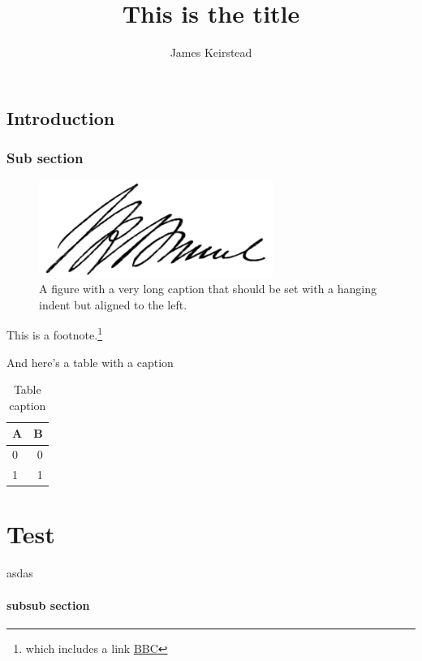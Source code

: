 \documentclass[a4paper]{imparticle}
\title{This is the title}
\author{James Keirstead}
\begin{document}
\maketitle

\section{Introduction}

\lipsum[1]

\subsection{Sub section}
\lipsum[2]

\begin{figure}[htbp]
  \includegraphics[width=3in]{Isambard_Kingdom_Brunel_signature.png}
  \caption{A figure with a very long caption that should be set with a hanging indent but aligned to the left.}
\end{figure}

This is a footnote.\footnote{which includes a link \href{http://www.bbc.co.uk}{BBC}}

And here's a table with a caption
\begin{table}[htbp]
  \centering
  \begin{tabular}{lr}
    \toprule
    A & B \\
    \midrule
    0 & 0 \\
    1 & 1 \\
    \bottomrule
  \end{tabular}
  \caption{Table caption}
\end{table}

\chapter{Test}
asdas

\subsubsection*{subsub section}
\lipsum[3]
\end{document}
